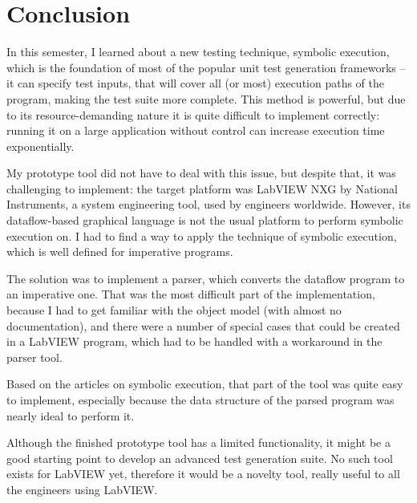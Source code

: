 \chapter{Conclusion}

In this semester, I learned about a new testing technique, symbolic execution, which is the foundation of most of the popular unit test generation frameworks -- it can specify test inputs, that will cover all (or most) execution paths of the program, making the test suite more complete. This method is powerful, but due to its resource-demanding nature it is quite difficult to implement correctly: running it on a large application without control can increase execution time exponentially. 

My prototype tool did not have to deal with this issue, but despite that, it was challenging to implement: the target platform was LabVIEW NXG by National Instruments, a system engineering tool, used by engineers worldwide. However, its dataflow-based graphical language is not the usual platform to perform symbolic execution on. I had to find a way to apply the technique of symbolic execution, which is well defined for imperative programs.

The solution was to implement a parser, which converts the dataflow program to an imperative one. That was the most difficult part of the implementation, because I had to get familiar with the object model (with almost no documentation), and there were a number of special cases that could be created in a LabVIEW program, which had to be handled with a workaround in the parser tool.

Based on the articles on symbolic execution, that part of the tool was quite easy to implement, especially because the data structure of the parsed program was nearly ideal to perform it. 

Although the finished prototype tool has a limited functionality, it might be a good starting point to develop an advanced test generation suite. No such tool exists for LabVIEW yet, therefore it would be a novelty tool, really useful to all the engineers using LabVIEW.